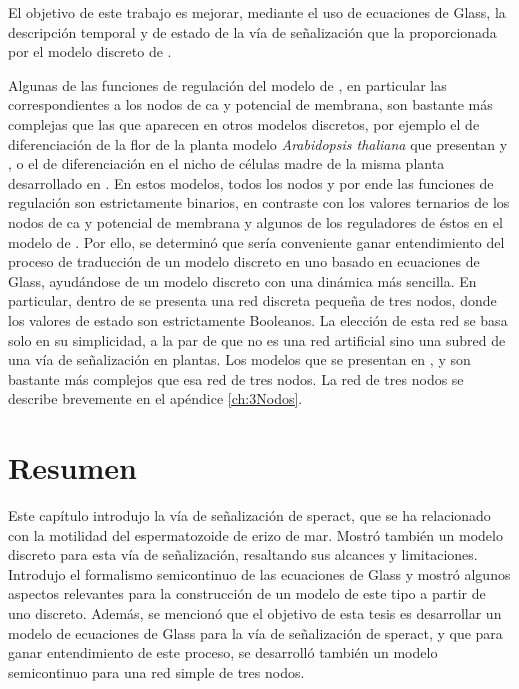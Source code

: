 El objetivo de este trabajo es mejorar, mediante el uso de ecuaciones de Glass, la descripción temporal y de estado de la vía de señalización que la proporcionada por el modelo discreto de \citeauthor{Espinal2011} \citep{Espinal2011}. 

Algunas de las funciones de regulación del modelo de \citeauthor{Espinal2011} \citep{Espinal2011}, en particular las correspondientes a los nodos de \ac{ca} y potencial de membrana, son bastante más complejas que las que aparecen en otros modelos discretos, por ejemplo el de diferenciación de la flor de la planta modelo  \emph{Arabidopsis thaliana} que presentan \citeauthor{EspinosaSoto:2004jr} \citep{EspinosaSoto:2004jr} y \citeauthor{AlvarezBuylla:2008cg} \citep{AlvarezBuylla:2008cg}, o el de diferenciación en el nicho de células madre de la misma planta desarrollado en \citeauthor{Azpeitia:2010ik} \citep{Azpeitia:2010ik}. En estos modelos, todos los nodos y por ende las funciones de regulación son estrictamente binarios, en contraste con los valores ternarios de los nodos de \ac{ca} y potencial de membrana y algunos de los reguladores de éstos en el modelo de \citeauthor{Espinal2011}. Por ello, se determinó que sería conveniente ganar entendimiento del proceso de traducción de un modelo discreto en uno basado en ecuaciones de Glass, ayudándose de un modelo discreto con una dinámica más sencilla. En particular, dentro de  \citeauthor{Reka3Nodos2010} \citep{Reka3Nodos2010} se presenta una red discreta pequeña de tres nodos, donde los valores de estado son estrictamente Booleanos. La elección de esta red se basa solo en su simplicidad, a la par de que no es una red artificial sino una subred de una vía de señalización en plantas. Los modelos que se presentan en \citeauthor{EspinosaSoto:2004jr} \citep{EspinosaSoto:2004jr}, \citeauthor{AlvarezBuylla:2008cg} \citep{AlvarezBuylla:2008cg} y \citeauthor{Azpeitia:2010ik} \citep{Azpeitia:2010ik} son bastante más complejos que esa red de tres nodos. La red de tres nodos se describe brevemente en el apéndice \ref{ch:3Nodos}.

\section{Resumen}
Este capítulo introdujo la vía de señalización de speract, que se ha relacionado con la motilidad del espermatozoide de erizo de mar. Mostró también un modelo discreto para esta vía de señalización, resaltando sus alcances y limitaciones. Introdujo el formalismo semicontinuo de las ecuaciones de Glass y mostró algunos aspectos relevantes para la construcción de un modelo de este tipo a partir de uno discreto. Además, se mencionó que el objetivo de esta tesis es desarrollar un modelo de ecuaciones de Glass para la vía de señalización de speract, y que para ganar entendimiento de este proceso, se desarrolló también un modelo semicontinuo para una red simple de tres nodos.

